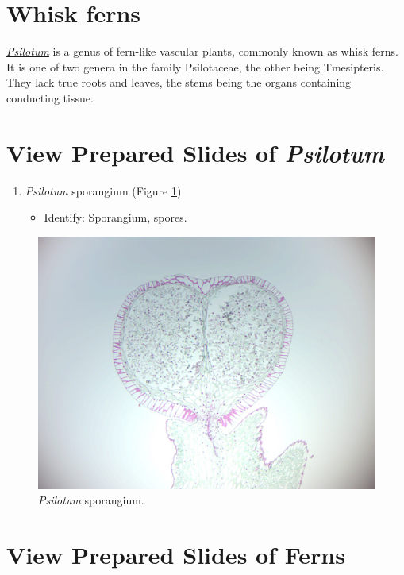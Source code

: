 \section{Whisk ferns}\label{whisk-ferns}

\href{https://en.wikipedia.org/wiki/Psilotum}{\emph{Psilotum}} is a genus of
fern-like vascular plants, commonly known as whisk ferns. It is one of
two genera in the family Psilotaceae, the other being Tmesipteris. They
lack true roots and leaves, the stems being the organs containing
conducting tissue.

\section{View Prepared Slides of
\emph{Psilotum}}\label{view-prepared-slides-of-psilotum}

\begin{enumerate}
\def\labelenumi{\arabic{enumi}.}
\tightlist
\item
  \emph{Psilotum} sporangium (Figure \ref{fig:psilotumsporangium})

  \begin{itemize}
  \tightlist
  \item
    Identify: Sporangium, spores.
  \end{itemize}
\end{enumerate}

\begin{figure}

{\centering \includegraphics[width=0.7\linewidth]{./figures/mosses/psilotum_sporangium}

}

\caption{\emph{Psilotum} sporangium.}\label{fig:psilotumsporangium}
\end{figure}

\section{View Prepared Slides of
Ferns}\label{view-prepared-slides-of-ferns}

